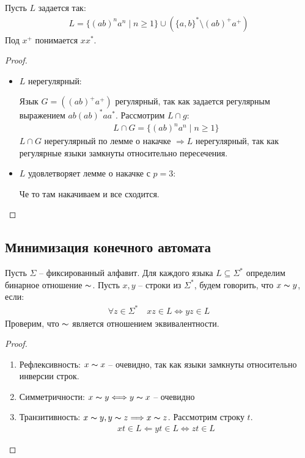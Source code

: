 Пусть $L$ задается так:
\begin{gather*}
    L = \{(ab)^n a^n \mid n \geqslant 1\} \cup \left( \{a, b\}^* \setminus (ab)^+ a^+ \right)
\end{gather*}
Под $x^+$ понимается $x x^*$. 
\begin{proof} \quad

    \begin{itemize}
        \item $L$ нерегулярный: 
        
        Язык $G = ((ab)^+ a^+)$ регулярный, так как задается регулярным выражением $ab(ab)^* a a^*$. Рассмотрим $L \cap g$:
        \begin{gather*}
            L \cap G = \{ (ab)^n a^n \mid n \geqslant 1 \}
        \end{gather*}
        $L \cap G$ нерегулярный по лемме о накачке $\Longrightarrow L$ нерегулярный, так как регулярные языки замкнуты относительно пересечения. 
        \item $L$ удовлетворяет лемме о накачке с $p = 3$:
        
        Че то там накачиваем и все сходится.
    \end{itemize}
\end{proof}

\subsection{Минимизация конечного автомата}

Пусть $\Sigma$ -- фиксированный алфавит. Для каждого языка $L \subseteq \Sigma^*$ определим бинарное отношение $\thicksim$. Пусть $x, y$ -- строки из $\Sigma^*$, будем говорить, что $x \thicksim y$, если:
\begin{gather*}
    \forall z \in \Sigma^* \quad xz \in L \Longleftrightarrow yz \in L
\end{gather*}
Проверим, что $\thicksim$ является отношением эквивалентности. 
\begin{proof} \quad

    \begin{enumerate}
        \item Рефлексивность: $x \thicksim x$ -- очевидно, так как языки замкнуты относительно инверсии строк. 
        \item Симметричности: $x \thicksim y \Longleftrightarrow y \thicksim x$ -- очевидно 
        \item Транзитивность: $x \thicksim y, y \thicksim z \Longrightarrow x \thicksim z$. Рассмотрим строку $t$. 
        \begin{gather*}
            xt \in L \Longleftarrow yt \in L \Longleftrightarrow zt \in L
        \end{gather*}
    \end{enumerate}
\end{proof}

